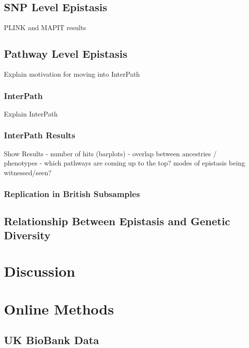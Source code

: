 \documentclass[12pt, a4paper]{article}
\begin{document}
\subsection{SNP Level Epistasis}\label{InterPath-Results-SNPEpistasis}

PLINK and MAPIT results

\subsection{Pathway Level Epistasis}\label{InterPath-Results-PathwayEpistasis}

Explain motivation for moving into InterPath

\subsubsection{InterPath}

Explain InterPath

\subsubsection{InterPath Results}

Show Results
 - number of hits (barplots)
 - overlap between ancestries / phenotypes
 - which pathways are coming up to the top? modes of epistasis being witnessed/seen?

\subsubsection{Replication in British Subsamples}

\subsection{Relationship Between Epistasis and Genetic Diversity}

\section{Discussion}\label{InterPath-Discussion}


\section{Online Methods}\label{InterPath-Online-Methods}

\subsection{UK BioBank Data}
\end{document}
